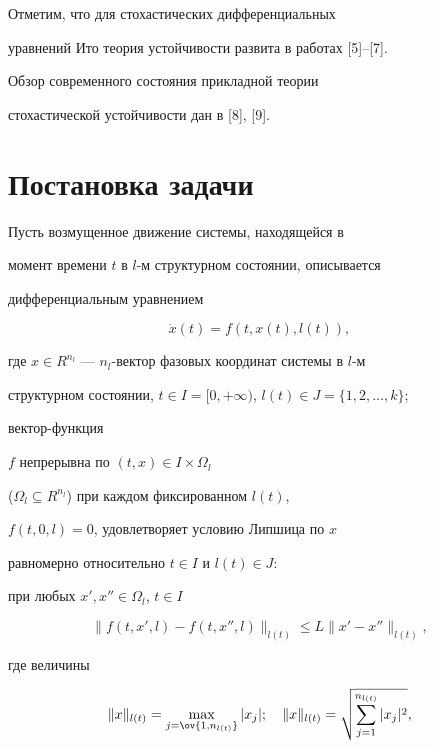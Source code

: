 Отметим, что для стохастических дифференциальных 


уравнений Ито теория устойчивости развита в работах [5]--[7].  


Обзор современного состояния прикладной теории  


стохастической устойчивости дан в [8], [9]. 


 


 


\section{Постановка задачи} 


 


Пусть возмущенное движение системы, находящейся в 


момент времени $t$ в $l$-м структурном состоянии, описывается  


дифференциальным уравнением 


\begin{equation} 


\Dot x(t)=f(t,x(t),l(t)), 


\end{equation} 


где $x\in R^{n_l}$ --- $n_l$-вектор фазовых координат системы в $l$-м 


структурном состоянии, $t\in I=[0,+\infty)$, $l(t)\in J=\{1,2,\dotsc,k\}$; 


вектор-функция 


$f$ непрерывна по $(t,x)\in I\times\Omega_l$ 


($\Omega_l\subseteq R^{n_l}$) при каждом фиксированном $l(t)$, 


$f(t,0,l)=0$, удовлетворяет условию Липшица по $x$ 


равномерно относительно $t\in I$ и $l(t)\in J$: 


при любых $x',x''\in\Omega_l$, $t\in I$ 


$$ 


\|f(t,x',l)-f(t,x'',l)\|_{l(t)}\le L\|x'-x''\|_{l(t)}, 


$$ 


где величины 


\begin{equation} 


\|x\|_{l(t)}=\max_{j=\ov{1,n_{l(t)}}}|x_j|;\quad 


\|x\|_{l(t)}=\sqrt{\sum\limits^{n_{l(t)}}_{j=1}|x_j|^2}, 


\end{equation} 



